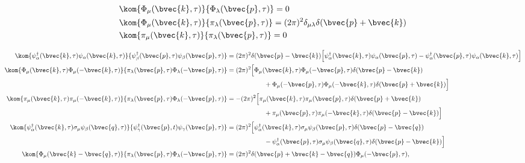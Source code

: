 %
\begin{align}
	&\kom{\Phi_{\mu}(\bvec{k},\tau)}{\Phi_{\lambda}(\bvec{p},\tau)} = 0
	\\
	&\kom{\Phi_{\mu}(\bvec{k},\tau)}{\pi_{\lambda}(\bvec{p},\tau)} = (2\pi)^{2} \delta_{\mu\lambda} \delta(\bvec{p}+\bvec{k})
	\\
	&\kom{\pi_{\mu}(\bvec{k},\tau)}{\pi_{\lambda}(\bvec{p},\tau)} = 0
\end{align}
%



%
\begin{align}
	\kom{\psi_{\alpha}^{\dag}(\bvec{k},\tau) \psi_{\alpha}(\bvec{k},\tau)}{\psi_{\beta}^{\dag}(\bvec{p},\tau) \psi_{\beta}(\bvec{p},\tau)} &=
	(2\pi)^{2} \delta(\bvec{p}-\bvec{k}) \Big[
		\psi_{\alpha}^{\dag}(\bvec{k},\tau) \psi_{\alpha}(\bvec{p},\tau)
		- 
		\psi_{\alpha}^{\dag}(\bvec{p},\tau) \psi_{\alpha}(\bvec{k},\tau)
	\Big]
	\label{eq:Kommutator 1}
	\\
	\kom{\Phi_{\mu}(\bvec{k},\tau) \Phi_{\mu}(-\bvec{k},\tau)}{\pi_{\lambda}(\bvec{p},\tau) \Phi_{\lambda}(-\bvec{p},\tau)} &=
	(2\pi)^{2} \Big[
		\Phi_{\mu}(\bvec{k},\tau)
		\Phi_{\mu}(-\bvec{p},\tau)	
		\delta(\bvec{p}-\bvec{k})
		\notag \\& \hspace{2cm} 
		+ 
		\Phi_{\mu}(-\bvec{p},\tau) 
		\Phi_{\mu}(-\bvec{k},\tau) 
		\delta(\bvec{p}+\bvec{k})
	\Big]
	\label{eq:Kommutator 2}
	\\
	\kom{\pi_{\mu}(\bvec{k},\tau) \pi_{\mu}(-\bvec{k},\tau)}{\pi_{\lambda}(\bvec{p},\tau) \Phi_{\lambda}(-\bvec{p},\tau)} &=
	-(2\pi)^{2} \Big[
		\pi_{\mu}(\bvec{k},\tau) 
		\pi_{\mu}(\bvec{p},\tau) 
		\delta(\bvec{p}+\bvec{k}) 
		\notag \\& \hspace{2cm}
		+ 
		\pi_{\mu}(\bvec{p},\tau) 
		\pi_{\mu}(-\bvec{k},\tau) 
		\delta(\bvec{p}-\bvec{k})
	\Big]
	\label{eq:Kommutator 3}
	\\
	\kom{\psi_{\alpha}^{\dag}(\bvec{k},\tau) \sigma_{\mu} \psi_{\beta}(\bvec{q},\tau)}{\psi_{\gamma}^{\dag}(\bvec{p},t) \psi_{\gamma}(\bvec{p},\tau)} &=
	(2\pi)^{2} \Big[
		\psi_{\alpha}^{\dag}(\bvec{k},\tau) \sigma_{\mu} \psi_{\beta}(\bvec{p},\tau) \delta(\bvec{p}-\bvec{q})
		\notag \\& \hspace{2cm}
		- 
		\psi_{\alpha}^{\dag}(\bvec{p},\tau) \sigma_{\mu} \psi_{\beta}(\bvec{q},\tau) \delta(\bvec{p}-\bvec{k})
	\Big]
	\label{eq:Kommutator 4}
	\\
	\kom{\Phi_{\mu}(\bvec{k}-\bvec{q},\tau)}{\pi_{\lambda}(\bvec{p},\tau) \Phi_{\lambda}(-\bvec{p},\tau)} &=
	(2\pi)^{2} \delta(\bvec{p}+\bvec{k}-\bvec{q}) \Phi_{\mu}(-\bvec{p},\tau),
	\label{eq:Kommutator 5}
\end{align}
%



